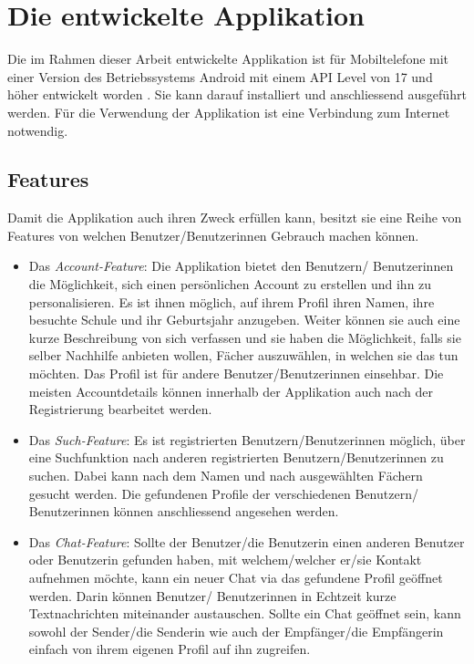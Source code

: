 \documentclass[../main.tex]{subfiles}
\begin{document}
\chapter{Die entwickelte Applikation} \label{studnetzApplikation}
Die im Rahmen dieser Arbeit entwickelte Applikation ist für Mobiltelefone mit einer Version des Betriebssystems Android mit einem API Level von 17 und höher entwickelt worden \cite{android:APILevel}. Sie kann darauf installiert und anschliessend ausgeführt werden. Für die Verwendung der Applikation ist eine Verbindung zum Internet notwendig.

\section{Features}
Damit die Applikation auch ihren Zweck erfüllen kann, besitzt sie eine Reihe von Features von welchen Benutzer/Benutzerinnen Gebrauch machen können.

\sloppy
\begin{itemize}
	\item Das \emph{Account-Feature}: Die Applikation bietet den Benutzern/ Benutzerinnen die Möglichkeit, sich einen persönlichen Account zu erstellen und ihn zu personalisieren. Es ist ihnen möglich, auf ihrem Profil ihren Namen, ihre besuchte Schule und ihr Geburtsjahr anzugeben. Weiter können sie auch eine kurze Beschreibung von sich verfassen und sie haben die Möglichkeit, falls sie selber Nachhilfe anbieten wollen, Fächer auszuwählen, in welchen sie das tun möchten. Das Profil ist für andere Benutzer/Benutzerinnen einsehbar. Die meisten Accountdetails können innerhalb der Applikation auch nach der Registrierung bearbeitet werden.
	\item Das \emph{Such-Feature}: Es ist registrierten Benutzern/Benutzerinnen möglich, über eine Suchfunktion nach anderen registrierten Benutzern/Benutzerinnen zu suchen. Dabei kann nach dem Namen und nach ausgewählten Fächern gesucht werden. Die gefundenen Profile der verschiedenen Benutzern/ Benutzerinnen können anschliessend angesehen werden.
	\item Das \emph{Chat-Feature}: Sollte der Benutzer/die Benutzerin einen anderen Benutzer oder Benutzerin gefunden haben, mit welchem/welcher er/sie Kontakt aufnehmen möchte, kann ein neuer Chat via das gefundene Profil geöffnet werden. Darin können Benutzer/ Benutzerinnen in Echtzeit kurze Textnachrichten miteinander austauschen. Sollte ein Chat geöffnet sein, kann sowohl der Sender/die Senderin wie auch der Empfänger/die Empfängerin einfach von ihrem eigenen Profil auf ihn zugreifen.
\end{itemize}
\fussy
\end{document}
